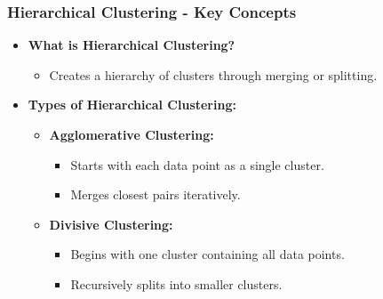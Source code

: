 \documentclass[aspectratio=169]{beamer}
\begin{document}
\begin{frame}[fragile]
    \frametitle{Hierarchical Clustering - Key Concepts}
    \begin{itemize}
        \item \textbf{What is Hierarchical Clustering?}
            \begin{itemize}
                \item Creates a hierarchy of clusters through merging or splitting.
            \end{itemize}
        \item \textbf{Types of Hierarchical Clustering:}
            \begin{itemize}
                \item \textbf{Agglomerative Clustering:} 
                    \begin{itemize}
                        \item Starts with each data point as a single cluster.
                        \item Merges closest pairs iteratively.
                    \end{itemize}
                \item \textbf{Divisive Clustering:} 
                    \begin{itemize}
                        \item Begins with one cluster containing all data points.
                        \item Recursively splits into smaller clusters.
                    \end{itemize}
            \end{itemize}
    \end{itemize}
\end{frame}
\end{document}
